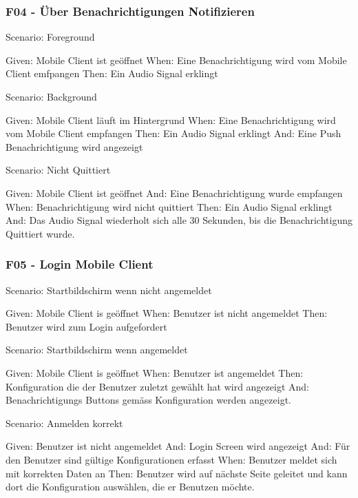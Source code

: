     \subsubsection*{F04 - Über Benachrichtigungen Notifizieren}

        Scenario: Foreground

        Given:  Mobile Client ist geöffnet
        When:   Eine Benachrichtigung wird vom Mobile Client emfpangen
        Then:   Ein Audio Signal erklingt

        Scenario: Background

        Given:  Mobile Client läuft im Hintergrund
        When:   Eine Benachrichtigung wird vom Mobile Client empfangen
        Then:   Ein Audio Signal erklingt
        And:    Eine Push Benachrichtigung wird angezeigt

        Scenario: Nicht Quittiert

        Given:  Mobile Client ist geöffnet
        And:    Eine Benachrichtigung wurde empfangen
        When:   Benachrichtigung wird nicht quittiert
        Then:   Ein Audio Signal erklingt
        And:    Das Audio Signal wiederholt sich alle 30 Sekunden, bis die Benachrichtigung Quittiert wurde.


    \subsubsection*{F05 - Login Mobile Client}

        Scenario: Startbildschirm wenn nicht angemeldet

        Given:  Mobile Client is geöffnet
        When: Benutzer ist nicht angemeldet
        Then: Benutzer wird zum Login aufgefordert

        Scenario: Startbildschirm wenn angemeldet

        Given:  Mobile Client is geöffnet
        When: Benutzer ist angemeldet
        Then: Konfiguration die der Benutzer zuletzt gewählt hat wird angezeigt
        And:   Benachrichtigungs Buttons gemäss Konfiguration werden angezeigt.


        Scenario: Anmelden korrekt

        Given: Benutzer ist nicht angemeldet
        And:   Login Screen wird angezeigt
        And:    Für den Benutzer sind gültige Konfigurationen erfasst
        When:  Benutzer meldet sich mit korrekten Daten an
        Then:  Benutzer wird auf nächste Seite geleitet und kann dort die Konfiguration auswählen, die er Benutzen möchte.

